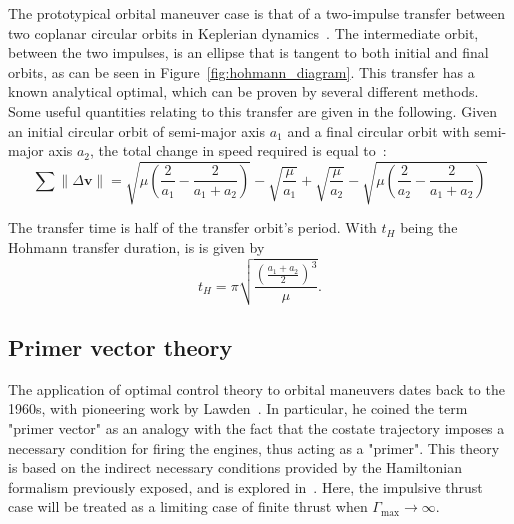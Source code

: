 The prototypical orbital maneuver case is that of a two-impulse transfer between two coplanar circular orbits in Keplerian dynamics~\cite{chobotov}. The intermediate orbit, between the two impulses, is an ellipse that is tangent to both initial and final orbits, as can be seen in Figure~\ref{fig:hohmann_diagram}. This transfer has a known analytical optimal, which can be proven by several different methods. Some useful quantities relating to this transfer are given in the following. Given an initial circular orbit of semi-major axis \(a_1\) and a final circular orbit with semi-major axis \(a_2\), the total change in speed required is equal to~\cite{chobotov}:
\begin{equation}\label{eq:hohmann_deltav}
    \sum \lVert \Delta \mathbf{v} \rVert = \sqrt{\mu\left(\frac{2}{a_1}-\frac{2}{a_1+a_2}\right)} - \sqrt{\frac{\mu}{a_1}} + \sqrt{\frac{\mu}{a_2}} - \sqrt{\mu\left(\frac{2}{a_2}-\frac{2}{a_1+a_2}\right)}
\end{equation}

The transfer time is half of the transfer orbit's period. With \(t_H\) being the Hohmann transfer duration, is is given by~\cite{chobotov} 
\begin{equation}\label{eq:hohmann_time}
    t_H = \pi \sqrt{\frac{\left(\frac{a_1+a_2}{2}\right)^3}{\mu}}.
\end{equation}

\subsection{Primer vector theory}
The application of optimal control theory to orbital maneuvers dates back to the 1960s, with pioneering work by Lawden~\cite{Conway_2010}. In particular, he coined the term "primer vector"  as an analogy with the fact that the costate trajectory imposes a necessary condition for firing the engines, thus acting as a "primer". This theory is based on the indirect necessary conditions provided by the Hamiltonian formalism previously exposed, and is explored in~\cite{Conway_2010}. Here, the impulsive thrust case will be treated as a limiting case of finite thrust when \(\Gamma_{\max} \rightarrow \infty\). 

